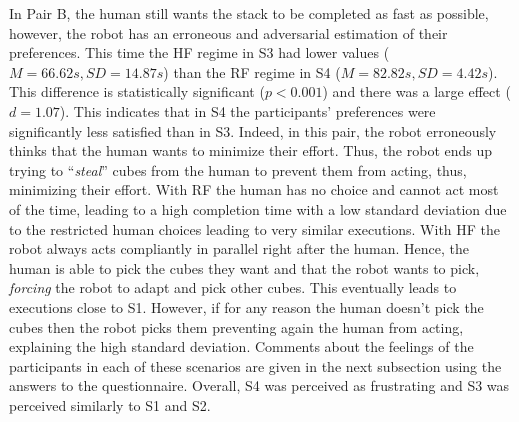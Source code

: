 In Pair B, the human still wants the stack to be completed as fast as possible, however, the robot has an erroneous and adversarial estimation of their preferences. This time the HF regime in S3 had lower values ($M=66.62s, SD=14.87s$) than the RF regime in S4 ($M=82.82s, SD=4.42s$). This difference is statistically significant ($p < 0.001$) and there was a large effect ($d = 1.07$). This indicates that in S4 the participants' preferences were significantly less satisfied than in S3. 
Indeed, in this pair, the robot erroneously thinks that the human wants to minimize their effort. Thus, the robot ends up trying to ``\textit{steal}'' cubes from the human to prevent them from acting, thus, minimizing their effort. With RF the human has no choice and cannot act most of the time, leading to a high completion time with a low standard deviation due to the restricted human choices leading to very similar executions. With HF the robot always acts compliantly in parallel right after the human. Hence, the human is able to pick the cubes they want and that the robot wants to pick, \textit{forcing} the robot to adapt and pick other cubes. This eventually leads to executions close to S1. However, if for any reason the human doesn't pick the cubes then the robot picks them preventing again the human from acting, explaining the high standard deviation. Comments about the feelings of the participants in each of these scenarios are given in the next subsection using the answers to the questionnaire. Overall, S4 was perceived as frustrating and S3 was perceived similarly to S1 and S2. 

